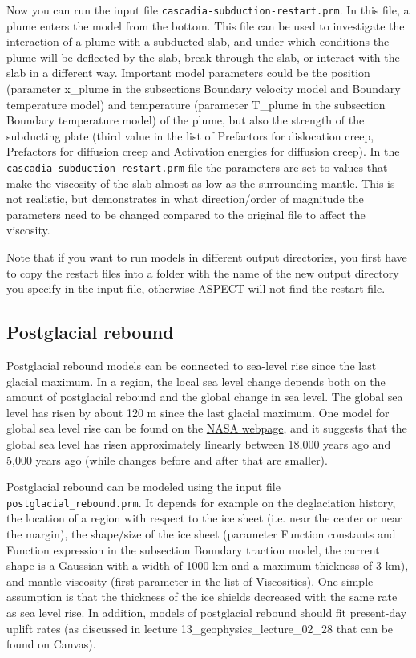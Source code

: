 \documentclass[notitlepage]{article}
\begin{document}
Now you can run the input file \texttt{cascadia-subduction-restart.prm}. In this file, a plume enters the model 
from the bottom. This file can be used to investigate the interaction of a plume with a subducted slab, and under
which conditions the plume will be deflected by the slab, break through the slab, or interact with the slab in a 
different way. Important model parameters could be the position (parameter x\_plume in the subsections Boundary 
velocity model and Boundary temperature model) and temperature (parameter T\_plume in the subsection Boundary 
temperature model) of the plume, but also the strength of the subducting plate (third value in the list of 
Prefactors for dislocation creep, Prefactors for diffusion creep and Activation energies for diffusion creep). 
In the \texttt{cascadia-subduction-restart.prm} file the parameters are set to values that make the viscosity of the
slab almost as low as the surrounding mantle. This is not realistic, but demonstrates in what direction/order
of magnitude the parameters need to be changed compared to the original file to affect the viscosity. 

Note that if you want to run models in different output directories, you first have to copy the restart files into a 
folder with the name of the new output directory you specify in the input file, otherwise ASPECT will not find 
the restart file. 

\subsection{Postglacial rebound}

Postglacial rebound models can be connected to sea-level rise since the last glacial maximum. 
In a region, the local sea level change depends both on the amount of postglacial rebound and the global change in sea level. 
The global sea level has risen by about 120 m since the last glacial maximum. One model for global sea level rise
can be found on the \href{https://www.giss.nasa.gov/research/briefs/gornitz_09/}{NASA webpage}, and it suggests that 
the global sea level has risen approximately linearly between 18,000 years ago and 5,000 years ago (while changes before
and after that are smaller). 

Postglacial rebound can be modeled using the input file \texttt{postglacial\_rebound.prm}. 
It depends for example on the deglaciation history, the location of a region with respect to the ice sheet 
(i.e. near the center or near the margin), the shape/size of the ice sheet (parameter Function constants and 
Function expression in the subsection Boundary traction model, the current shape is a Gaussian with a width of 
1000 km and a maximum thickness of 3 km), and mantle viscosity (first parameter in the list of Viscosities). 
One simple assumption is that the thickness of the ice shields decreased with the same rate as sea level rise. 
In addition, models of postglacial rebound should fit present-day uplift rates (as discussed in lecture 
13\_geophysics\_lecture\_02\_28 that can be found on Canvas). 
\end{document}
